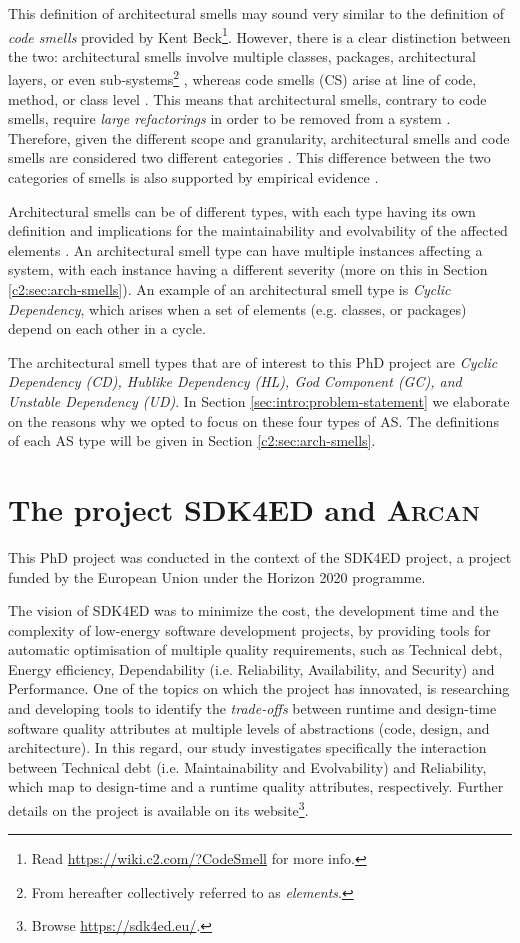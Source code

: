 This definition of architectural smells may sound very similar to the definition of \emph{code smells} provided by Kent Beck\footnote{Read \url{https://wiki.c2.com/?CodeSmell} for more info.}. 
However, there is a clear distinction between the two: architectural smells involve multiple classes, packages, architectural layers, or even sub-systems\footnote{From hereafter collectively referred to as \emph{elements}.} \cite{Lippert2006}, whereas code smells (CS) arise at line of code, method, or class level \cite{Fowler2002}. 
This means that architectural smells, contrary to code smells, require \emph{large refactorings} in order to be removed from a system \cite{Lippert2006}.
Therefore, given the different scope and granularity, architectural smells and code smells are considered two different categories \cite{Sharma2020}.
This difference between the two categories of smells is also supported by empirical evidence \cite{Arcelli2019}.

Architectural smells can be of different types, with each type having its own definition and implications for the maintainability and evolvability of the affected elements \cite{Azadi2019}.
An architectural smell type can have multiple instances affecting a system, with each instance having a different severity (more on this in Section \ref{c2:sec:arch-smells}).
An example of an architectural smell type is \emph{Cyclic Dependency}, which arises when a set of elements (e.g. classes, or packages) depend on each other in a cycle.

The architectural smell types that are of interest to this PhD project are \emph{Cyclic Dependency (CD), Hublike Dependency (HL), God Component (GC), and Unstable Dependency (UD)}.
In Section \ref{sec:intro:problem-statement} we elaborate on the reasons why we opted to focus on these four types of AS.
The definitions of each AS type will be given in Section \ref{c2:sec:arch-smells}.


\section{The project SDK4ED and \textsc{Arcan}}
This PhD project was conducted in the context of the SDK4ED project, a project funded by the European Union under the Horizon 2020 programme.

The vision of SDK4ED was to minimize the cost, the development time and the complexity of low-energy software development projects, by providing tools for automatic optimisation of multiple quality requirements, such as Technical debt, Energy efficiency, Dependability (i.e. Reliability, Availability, and Security) and Performance. 
One of the topics on which the project has innovated, is researching and developing tools to identify the \textit{trade-offs} between runtime and design-time software quality attributes at multiple levels of abstractions (code, design, and architecture).
In this regard, our study investigates specifically the interaction between Technical debt (i.e. Maintainability and Evolvability) and Reliability, which map to design-time and a runtime quality attributes, respectively. Further details on the project is available on its website\footnote{Browse \url{https://sdk4ed.eu/}.}.

